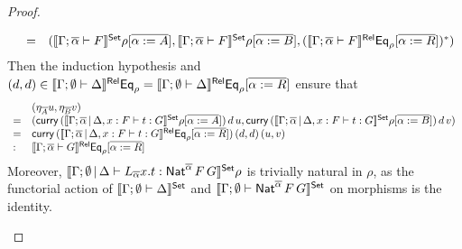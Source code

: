 \documentclass[acmsmall,review,anonymous]{acmart}
\theoremstyle{definition}
\renewcommand{\id}{\mathit{id}}
\begin{document}
\begin{proof}
\begin{itemize}
\[\begin{array}{lll}
&  = & (\llbracket{\Gamma;\overline{\alpha} \vdash F}\rrbracket^{\mathsf{Set}}
\rho[\overline{\alpha := A}], \llbracket{\Gamma;\overline{\alpha} \vdash
  F}\rrbracket^{\mathsf{Set}} \rho[\overline{\alpha := B}],
(\llbracket{\Gamma;\overline{\alpha} \vdash F}\rrbracket^{\mathsf{Rel}}
\mathsf{Eq}_{\rho}[\overline{\alpha := R}])^*)
\end{array}\]
Then the induction hypothesis and
$(d,d) \in \llbracket{\Gamma; \emptyset \vdash \Delta}\rrbracket^{\mathsf{Rel}} \mathsf{Eq}_\rho =
\llbracket{\Gamma; \emptyset \vdash \Delta}\rrbracket^{\mathsf{Rel}} \mathsf{Eq}_\rho[\overline{\alpha := R}]$
ensure that
\[\begin{array}{ll}
& (\eta_{\overline{A}}u,\eta_{\overline{B}}v)\\
= & (\mathsf{curry}\, (\llbracket{\Gamma; \overline{\alpha} \,|\, \Delta, x : F
  \vdash t: G}\rrbracket^{\mathsf{Set}}\rho[\overline{\alpha := A}])\,d\,u, \mathsf{curry}\,
(\llbracket{\Gamma; \overline{\alpha} \,|\, \Delta, x : F \vdash t:
  G}\rrbracket^{\mathsf{Set}}\rho[\overline{\alpha := B}])\,d\,v)\\
= & \mathsf{curry}\, (\llbracket{\Gamma; \overline{\alpha} \,|\, \Delta, x : F
  \vdash t: G}\rrbracket^{\mathsf{Rel}}\mathsf{Eq}_\rho[\overline{\alpha := R}])\,(d,d)\,(u,v)\\
: & \llbracket{\Gamma; \overline{\alpha} \vdash G}\rrbracket^{\mathsf{Rel}}
\mathsf{Eq}_{\rho}[\overline{\alpha := R}]  
\end{array}\]
Moreover,
$\llbracket{\Gamma; \emptyset \,|\, \Delta \vdash L_{\overline{\alpha}} x.t
: \mathsf{Nat}^{\overline{\alpha}} \,F \,G}\rrbracket^{\mathsf{Set}} \rho$
is trivially natural in $\rho$,
as the functorial action of
$\llbracket{\Gamma; \emptyset \vdash \Delta}\rrbracket^{\mathsf{Set}}$
and $\llbracket{\Gamma; \emptyset \vdash \mathsf{Nat}^{\overline{\alpha}} \,F \,G}\rrbracket^{\mathsf{Set}}$
on morphisms is the identity.

\end{itemize}
\end{proof}
\end{document}
